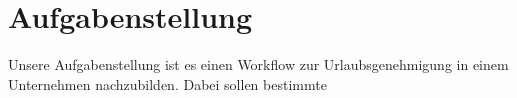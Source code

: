 \section{Aufgabenstellung}
Unsere Aufgabenstellung ist es einen Workflow zur Urlaubsgenehmigung in einem Unternehmen nachzubilden. Dabei sollen bestimmte 

